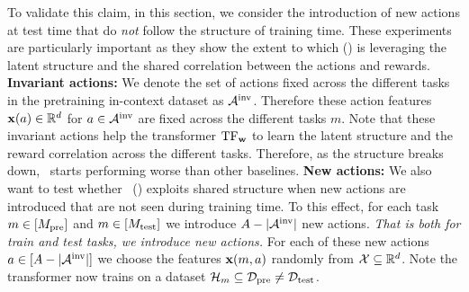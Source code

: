 \documentclass[10pt]{article}
\theoremstyle{plain}
\theoremstyle{definition}
\theoremstyle{remark}
\begin{document}
\vspace*{-1em}
To validate this claim, in this section, we consider the introduction of new actions at test time that do \textit{not} follow the structure of training time.
These experiments are particularly important as they show the extent to which \pred (\gt) is leveraging the latent structure and the shared correlation between the actions and rewards.
\textbf{Invariant actions:} We denote the set of actions fixed across the different tasks in the pretraining in-context dataset as $\mathcal{A}^{\text{inv}}$. Therefore these action features $\mathbf{x}(a)\in\mathbb{R}^d$ for $a\in \mathcal{A}^{\text{inv}}$ are fixed across the different tasks $m$. Note that these invariant actions help the transformer $\mathrm{TF}_{\mathbf{w}}$ to learn the latent structure and the reward correlation across the different tasks. Therefore, as the structure breaks down, \pred\ starts performing worse than other baselines.
\textbf{New actions:} We also want to test whether \pred\ (\gt) exploits shared structure when new actions are introduced that are not seen during training time. To this effect, for each task $m\in [M_{\text{pre}}]$ and $m\in [M_{\text{test}}]$ we introduce $A - |\mathcal{A}^{\text{inv}}|$ new actions. \textit{That is both for train and test tasks, we introduce new actions.}  For each of these new actions $a\in [A - |\mathcal{A}^{\text{inv}}|]$ we choose the features $\mathbf{x}(m,a)$ randomly from $\mathcal{X}\subseteq\mathbb{R}^d$. Note the transformer now trains on a dataset $\mathcal{H}_m \subseteq \mathcal{D}_{\text{pre}} \neq \mathcal{D}_{\text{test}}$.
\end{document}
